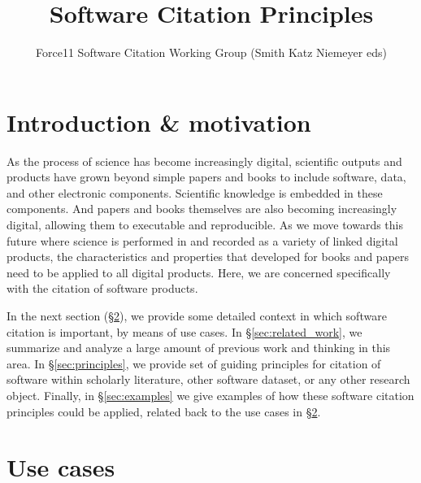 \documentclass[11pt, oneside]{amsart}
\title{Software Citation Principles}
\author{Force11 Software Citation Working Group (Smith Katz Niemeyer eds)}
\date{}
\begin{document}
\begin{abstract}
\end{abstract}

\maketitle


\section{Introduction \& motivation}
\label{sec:intro}

As the process of science has become increasingly digital, scientific outputs and products have
grown beyond simple papers and books to include software, data, and other electronic
components.  Scientific knowledge is embedded in these components.  And papers and books
themselves are also becoming increasingly digital, allowing them to executable
and reproducible.  As we move towards this future where science is performed in and recorded
as a variety of linked digital products, the characteristics and properties that developed for
books and papers need to be applied to all digital products.  Here, we are concerned specifically
with the citation of software products.

In the next section (\S\ref{sec:use_cases}), we provide some detailed context in which
software citation is important, by means of use cases.  In \S\ref{sec:related_work}, we
summarize and analyze a large amount of previous work and thinking in this area.  In
\S\ref{sec:principles}, we provide set of guiding principles for citation of software within
scholarly literature, other software dataset, or any other research object.  Finally,
in \S\ref{sec:examples} we give examples of how these software citation principles
could be applied, related back to the use cases in \S\ref{sec:use_cases}.

\section{Use cases}
\label{sec:use_cases}
\end{document}
